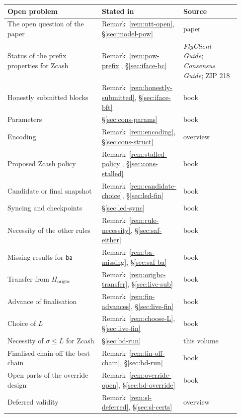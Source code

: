 \documentclass[11pt,a4paper]{article}
\theoremstyle{definition}
\newcommand{\Piorigbc}{\Pi_{\mathrm{origbc}}}
\newcommand{\ba}{\mathsf{ba}}
\begin{document}
\begin{table}[p]
\centering
\footnotesize \renewcommand{\arraystretch}{1.1}
\begin{tabular}{@{}p{0.42\linewidth}p{0.26\linewidth}p{0.25\linewidth}@{}}
\toprule
Open problem & Stated in & Source \\
\midrule
The open question of the paper
  & Remark~\ref{rem:ntt-open}, \S\ref{sec:model-pow} & paper \\
Status of the prefix properties for Zcash
  & Remark~\ref{rem:pow-prefix}, \S\ref{sec:iface-bc}
  & \emph{FlyClient Guide}; \emph{Consensus Guide}; ZIP 218 \\
Honestly submitted blocks
  & Remark~\ref{rem:honestly-submitted}, \S\ref{sec:iface-bft} & book \\
Parameters & \S\ref{sec:cons-params} & book \\
Encoding & Remark~\ref{rem:encoding}, \S\ref{sec:cons-struct} & overview \\
Proposed Zcash policy
  & Remark~\ref{rem:stalled-policy}, \S\ref{sec:cons-stalled} & book \\
Candidate or final snapshot
  & Remark~\ref{rem:candidate-choice}, \S\ref{sec:led-fin} & book \\
Syncing and checkpoints & \S\ref{sec:led-sync} & book \\
Necessity of the other rules
  & Remark~\ref{rem:rule-necessity}, \S\ref{sec:saf-either} & book \\
Missing results for $\ba$
  & Remark~\ref{rem:ba-missing}, \S\ref{sec:saf-ba} & book \\
Transfer from $\Piorigbc$
  & Remark~\ref{rem:origbc-transfer}, \S\ref{sec:live-sub} & book \\
Advance of finalisation
  & Remark~\ref{rem:fin-advances}, \S\ref{sec:live-fin} & book \\
Choice of $L$
  & Remark~\ref{rem:choose-L}, \S\ref{sec:live-fin} & book \\
Necessity of $\sigma \le L$ for Zcash & \S\ref{sec:bd-run} & this volume \\
Finalised chain off the best chain
  & Remark~\ref{rem:fin-off-chain}, \S\ref{sec:bd-run} & book \\
Open parts of the override design
  & Remark~\ref{rem:override-open}, \S\ref{sec:bd-override} & book \\
Deferred validity
  & Remark~\ref{rem:sl-deferred}, \S\ref{sec:sl-certs} & overview \\

\end{tabular}
\end{table}
\end{document}
